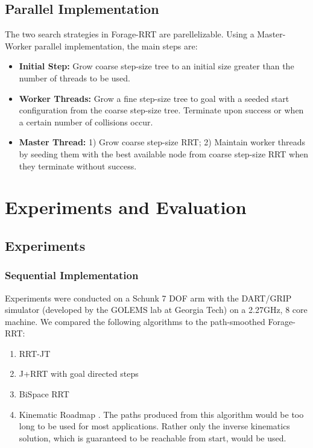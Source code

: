 \documentclass[conference]{IEEEtran}
\begin{document}
\subsection{Parallel Implementation}
The two search strategies in Forage-RRT are parellelizable.
Using a Master-Worker parallel implementation, the main steps are:
\begin{itemize}
  \item \textbf{Initial Step: } 
	Grow coarse step-size tree to an initial size greater than the number of
	threads to be used.
  \item \textbf{Worker Threads: } 
	Grow a fine step-size tree to goal with a seeded start configuration from 
	the coarse step-size tree. Terminate upon success or when a certain 
	number of collisions occur.
  \item \textbf{Master Thread: } 
    1) Grow coarse step-size RRT; 
	2) Maintain worker threads by seeding them with the best available node 
	  from coarse step-size RRT when they terminate without success.
\end{itemize}

\section{Experiments and Evaluation}
\label{sec:evaluation}
\subsection{Experiments}
\subsubsection{Sequential Implementation}
Experiments were conducted on a Schunk 7 DOF arm with the DART/GRIP
simulator (developed by the GOLEMS lab at Georgia Tech) on a 2.27GHz, 8 core
machine. We compared the following algorithms to the path-smoothed Forage-RRT:
\begin{enumerate}
  \item RRT-JT \cite{vande07}
  \item J+RRT with goal directed steps \cite{vahrenkamp09} 
  \item BiSpace RRT \cite{diankov08}
  \item Kinematic Roadmap \cite{ahuactzin99}. The paths produced 
    from this algorithm would be too long to be used for most applications. 
	Rather only the inverse kinematics solution, which is guaranteed to be 
	reachable from start, would be used.
\end{enumerate}
\end{document}
